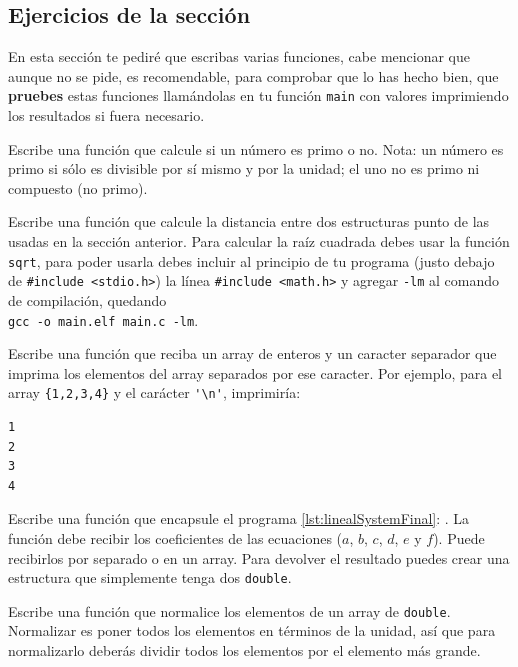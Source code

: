 \documentclass[a4paper]{article}
\begin{document}
\subsection{Ejercicios de la sección}
En esta sección te pediré que escribas varias funciones, cabe mencionar que
aunque no se pide, es recomendable, para comprobar que lo has hecho bien, que
\textbf{pruebes} estas funciones llamándolas en tu función \verb!main! con
valores  imprimiendo los resultados si fuera necesario.
\begin{exercises}[resume*]
\item Escribe una función que calcule si un número es primo o no. Nota: un
número
es primo si sólo es divisible por sí mismo y por la unidad; el uno no es primo ni
compuesto (no primo).
\item Escribe una función que calcule la distancia entre dos estructuras punto
de las usadas en la sección anterior. Para calcular la raíz cuadrada debes usar
la función \verb!sqrt!, para poder usarla debes incluir al principio de tu
programa (justo debajo de \verb!#include <stdio.h>!) la línea
\verb!#include <math.h>! y agregar \verb!-lm! al comando de compilación,
quedando \\
\verb!gcc -o main.elf main.c -lm!.
\item Escribe una función que reciba un array de enteros y un caracter separador
que imprima los elementos del array separados por ese caracter. Por ejemplo,
para el array \verb!{1,2,3,4}! y el carácter \verb!'\n'!, imprimiría:

\noindent
\begin{minipage}[H]{\linewidth}
\mbox{}
\begin{verbatim}
1
2
3
4
\end{verbatim}
\end{minipage}
\item Escribe una función que encapsule el programa
\ref{lst:linealSystemFinal}: .
La función debe recibir los coeficientes de las ecuaciones
($a$, $b$, $c$, $d$, $e$ y $f$). Puede recibirlos por separado o en un array.
Para devolver el resultado puedes crear una estructura que simplemente tenga
dos \verb!double!.
\item Escribe una función que normalice los elementos de un array de
\verb!double!. Normalizar es poner todos los elementos en términos de la unidad,
así que para normalizarlo deberás dividir todos los elementos por el elemento
más grande.
\end{exercises}
\end{document}
